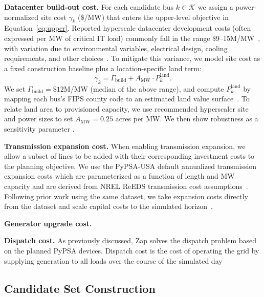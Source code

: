 \noindent\textbf{Datacenter build-out cost.} For each candidate bus $k \in \mathcal{K}$ we 
assign a power-normalized site cost $\gamma_k$ (\$/MW) that enters the upper-level objective in
Equation~\eqref{eq:upper}. Reported hyperscale datacenter development costs
(often expressed per MW of critical IT load) commonly fall in the range
\$9--15M/MW~\cite{CushWakeCostGuide_2025}, with variation due to 
environmental variables, electrical design, cooling requirements, and other
choices~\cite{stojkovic2025rearchitectingdatacenterlifecycleai}.
To mitigate this variance, we model site cost as a fixed construction 
baseline plus a location-specific land term:
\begin{equation}\label{eqn:investment-cost}
    \gamma_k = \Gamma_{\text{build}} + A_{\text{MW}} \cdot P^{\text{land}}_k.
\end{equation}
We set $\Gamma_{\text{build}} = \$12$M/MW (median of the above range), and
compute $P^{\text{land}}_k$ by mapping each bus's FIPS county code to an
estimated land value surface~\cite{land-cost}. To relate land area to 
provisioned capacity, we use recommended hyperscaler site and power sizes to 
set $A_{\text{MW}} = 0.25$ acres per MW. We then show 
robustness as a sensitivity parameter \cite{stream_landowners_2025}.

\noindent\textbf{Transmission expansion cost.} When enabling transmission expansion, we allow a subset of
lines to be added with their corresponding investment costs to the
planning objective. We use the PyPSA-USA default annualized transmission expansion costs which are parameterized as a function of length and MW capacity
and are derived from NREL ReEDS transmission cost assumptions~\cite{nrel-reeds, tehranchi5029120pypsa}. 
Following prior work using the same dataset, we take expansion costs directly 
from the dataset and scale capital costs to the simulated horizon~\cite{degleris2024gradient}.

\noindent\textbf{Generator upgrade cost.} 

\noindent\textbf{Dispatch cost.}  As previously discussed, Zap solves the dispatch problem based on the planned PyPSA devices. Dispatch cost is the cost of operating the grid by supplying generation to all loads over the course of the simulated day 



\subsection{Candidate Set Construction}

